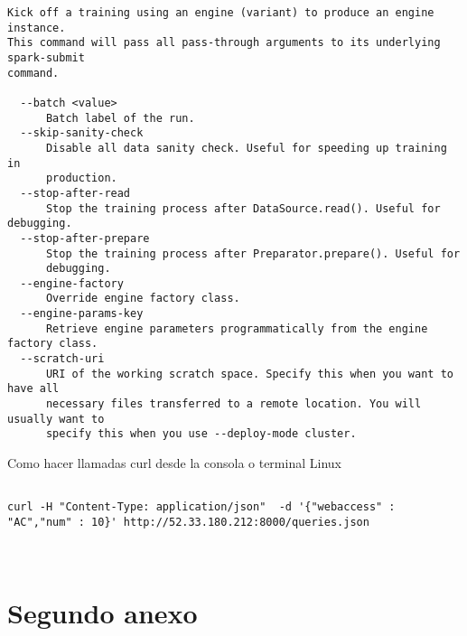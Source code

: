 \begin{lstlisting}[frame=single,basicstyle=\ttfamily\tiny,]
Kick off a training using an engine (variant) to produce an engine instance.
This command will pass all pass-through arguments to its underlying spark-submit
command.

  --batch <value>
      Batch label of the run.
  --skip-sanity-check
      Disable all data sanity check. Useful for speeding up training in
      production.
  --stop-after-read
      Stop the training process after DataSource.read(). Useful for debugging.
  --stop-after-prepare
      Stop the training process after Preparator.prepare(). Useful for
      debugging.
  --engine-factory
      Override engine factory class.
  --engine-params-key
      Retrieve engine parameters programmatically from the engine factory class.
  --scratch-uri
      URI of the working scratch space. Specify this when you want to have all
      necessary files transferred to a remote location. You will usually want to
      specify this when you use --deploy-mode cluster.

\end{lstlisting}

\vspace{1cm}

Como hacer llamadas curl desde la consola o terminal Linux


\begin{lstlisting}

curl -H "Content-Type: application/json"  -d '{"webaccess" : "AC","num" : 10}' http://52.33.180.212:8000/queries.json



\end{lstlisting}







\chapter{Segundo anexo}
\label{ch:anexo-b}




